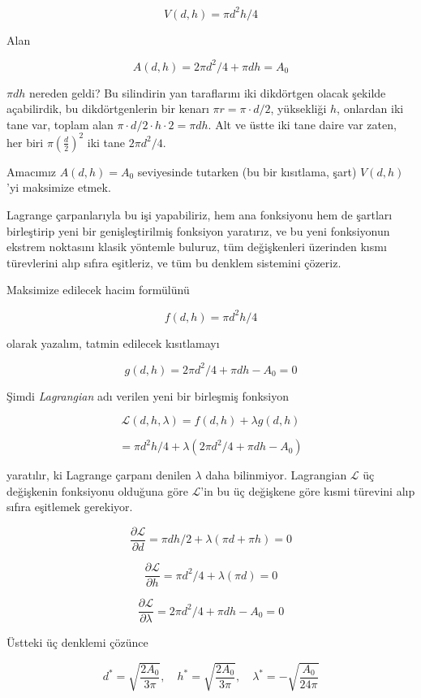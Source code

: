 \documentclass[12pt,fleqn]{article}\usepackage{../../common}
\begin{document}
$$
V(d,h) = \pi d^2 h / 4
$$

Alan

$$
A(d,h) = 2 \pi d^2 / 4 + \pi d h = A_0
$$

$\pi d h$ nereden geldi? Bu silindirin yan taraflarını iki dikdörtgen
olacak şekilde açabilirdik, bu dikdörtgenlerin bir kenarı
$\pi r = \pi \cdot d/2$, yüksekliği $h$, onlardan iki tane var, toplam alan
$\pi \cdot d/2 \cdot h \cdot 2 = \pi d h$. Alt ve üstte iki tane daire var
zaten, her biri $\pi \left( \frac{d}{2} \right)^2$ iki tane
$2 \pi d^2 / 4$. 

Amacımız $A(d,h) = A_0$ seviyesinde tutarken (bu bir kısıtlama, şart)
$V(d,h)$'yi maksimize etmek. 

Lagrange çarpanlarıyla bu işi yapabiliriz, hem ana fonksiyonu hem de
şartları birleştirip yeni bir genişleştirilmiş fonksiyon yaratırız, ve bu
yeni fonksiyonun ekstrem noktasını klasik yöntemle buluruz, tüm
değişkenleri üzerinden kısmı türevlerini alıp sıfıra eşitleriz, ve tüm bu
denklem sistemini çözeriz. 

Maksimize edilecek hacim formülünü 

$$
f(d,h) = \pi d^2 h / 4
$$

olarak yazalım, tatmin edilecek kısıtlamayı

$$
g(d,h) = 2 \pi d^2 / 4 + \pi d h - A_0 = 0
$$

Şimdi {\em Lagrangian} adı verilen yeni bir birleşmiş fonksiyon 

$$
\mathcal{L}(d,h,\lambda) = f(d,h) + \lambda g(d,h) 
$$

$$
= \pi d^2 h / 4 + \lambda (2 \pi d^2 / 4 + \pi d h - A_0 )
$$

yaratılır, ki Lagrange çarpanı denilen $\lambda$ daha
bilinmiyor. Lagrangian $\mathcal{L}$ üç değişkenin fonksiyonu olduğuna göre
$\mathcal{L}$'in bu üç değişkene göre kısmi türevini alıp sıfıra eşitlemek
gerekiyor. 

$$
\frac{\partial \mathcal{L}}{\partial d} = \pi d h / 2 + \lambda (\pi d + \pi h) = 0
$$

$$
\frac{\partial \mathcal{L}}{\partial h} = \pi d^2 / 4 + \lambda (\pi d) = 0 
$$

$$
\frac{\partial \mathcal{L}}{\partial \lambda} = 2\pi d^2 / 4 + \pi d h - A_0 = 0
$$

Üstteki üç denklemi çözünce 

$$
d^\ast = \sqrt{\frac{2 A_0}{3 \pi}}, \quad
h^\ast = \sqrt{\frac{2 A_0}{3 \pi}}, \quad
\lambda^\ast = -\sqrt{\frac{A_0}{24 \pi}}
$$
\end{document}

